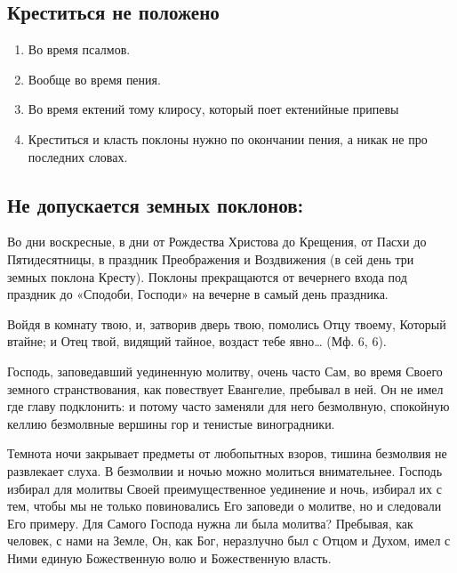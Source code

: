 \subsection*{Креститься не положено}


\begin{enumerate}


\item Во время псалмов.

\item Вообще во время пения.

\item Во время ектений тому клиросу, который поет ектенийные припевы

\item Креститься и класть поклоны нужно по окончании пения, а никак не про последних словах.


\end{enumerate}






\subsection*{Не допускается земных поклонов:}






Во дни воскресные, в дни от Рождества Христова до Крещения, от Пасхи до Пятидесятницы, в праздник Преображения и Воздвижения (в сей день три земных поклона Кресту). Поклоны прекращаются от вечернего входа под праздник до «Сподоби, Господи» на вечерне в самый день праздника.
\mychapterending

 


Войдя в комнату твою, и, затворив дверь твою, помолись Отцу твоему, Который втайне; и Отец твой, видящий тайное, воздаст тебе явно… (Мф. 6, 6).

Господь, заповедавший уединенную молитву, очень часто Сам, во время Своего земного странствования, как повествует Евангелие, пребывал в ней. Он не имел где главу подклонить: и потому часто заменяли для него безмолвную, спокойную келлию безмолвные вершины гор и тенистые виноградники.

Темнота ночи закрывает предметы от любопытных взоров, тишина безмолвия не развлекает слуха. В безмолвии и ночью можно молиться внимательнее. Господь избирал для молитвы Своей преимущественное уединение и ночь, избирал их с тем, чтобы мы не только повиновались Его заповеди о молитве, но и следовали Его примеру. Для Самого Господа нужна ли была молитва? Пребывая, как человек, с нами на Земле, Он, как Бог, неразлучно был с Отцом и Духом, имел с Ними единую Божественную волю и Божественную власть.

